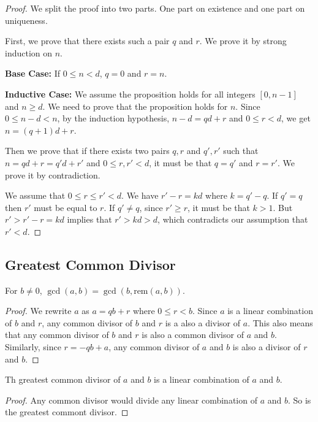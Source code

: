 \documentclass[11pt]{article}
\newcommand{\rem}{\mathrm{rem}}
\begin{document}
\begin{proof}
We split the proof into two parts. One part on existence and one part on uniqueness.

First, we prove that there exists such a pair $q$ and $r$. We prove it by strong induction
on $n$.

\textbf{Base Case:} If $0 \leq n < d$, $q = 0$ and $r = n$.

\textbf{Inductive Case:} We assume the proposition holds for all integers $[0,n-1]$ and
$n \geq d$. We need to prove that the proposition holds for $n$. Since $0 \leq n-d < n$,
by the induction hypothesis, $n-d=qd+r$ and $0 \leq r < d$, we get $n=(q+1)d+r$.

Then we prove that if there exists two pairs $q,r$ and $q',r'$ such that $n=qd+r=q'd+r'$
and $0 \leq r,r' < d$, it must be that $q=q'$ and $r=r'$. We prove it by contradiction.

We assume that $0 \leq r \leq r' < d$. We have $r'-r=kd$ where $k = q'-q$. If $q'=q$ then
$r'$ must be equal to $r$. If $q' \neq q$, since $r' \geq r$, it must be that $k > 1$.
But $r' > r'-r=kd$ implies that $r' > kd > d$, which contradicts our assumption that
$r' < d$.

\end{proof}

\subsection{Greatest Common Divisor}

\begin{lemma} \label{lemma:6}
For $b \neq 0$, $\gcd(a,b) = \gcd(b,\rem(a,b))$.
\end{lemma}

\begin{proof}
We rewrite $a$ as $a = qb+r$ where $0 \leq r < b$. Since $a$ is a linear combination of $b$
and $r$, any common divisor of $b$ and $r$ is a also a divisor of $a$. This also means that
any common divisor of $b$ and $r$ is also a common divisor of $a$ and $b$. Similarly, since
$r = -qb+a$, any common divisor of $a$ and $b$ is also a divisor of $r$ and $b$.
\end{proof}

\begin{theorem} \label{theorem:7}
Th greatest common divisor of $a$ and $b$ is a linear combination of $a$ and $b$.
\end{theorem}

\begin{proof}
Any common divisor would divide any linear combination of $a$ and $b$. So is the greatest
commont divisor.
\end{proof}
\end{document}
